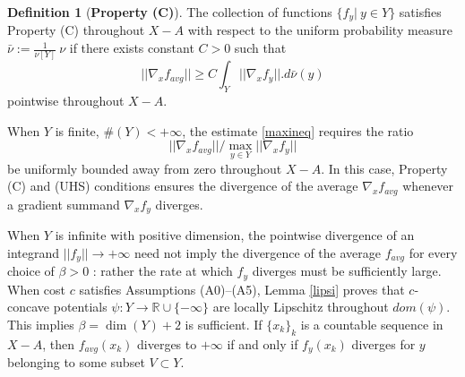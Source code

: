 \documentclass[12pt]{amsart}
\newtheorem{lem}{Lemma}
\theoremstyle{definition}
\newtheorem{dfn}{Definition}
\theoremstyle{remark}
\newcommand{\bR}{\mathbb{R}}
\begin{document}
\begin{dfn}[\textbf{Property (C)}] \label{a5spec}
The collection of functions $\{f_y|~y\in Y\}$ satisfies Property (C) throughout $X-A$ with respect to the uniform probability measure $\bar{\nu}:=\frac{1}{\nu[Y]}~\nu$ if there exists constant $C>0$ such that \begin{equation}
||\nabla_x f_{avg}|| \geq C \int_Y ||\nabla_x f_y||.d\bar{\nu}(y) \label{maxineq}
\end{equation}
pointwise throughout $X-A$.
\end{dfn}

When $Y$ is finite, $\#(Y)<+\infty$, the estimate \eqref{maxineq} requires the ratio $$||\nabla_x f_{avg}||/ \max_{y\in Y}||\nabla_x f_y||$$ be uniformly bounded away from zero throughout $X-A$. In this case, Property (C) and (UHS) conditions ensures the divergence of the average $\nabla_x f_{avg}$ whenever a gradient summand $\nabla_x f_y$ diverges. 

When $Y$ is infinite with positive dimension, the pointwise divergence of an integrand $||f_y||\to +\infty$ need not imply the divergence of the average $f_{avg}$ for every choice of $\beta>0$ : rather the rate at which $f_y$ diverges must be sufficiently large. When cost $c$ satisfies Assumptions (A0)--(A5), Lemma \ref{lipsi} proves that $c$-concave potentials $\psi: Y\to \bR \cup \{-\infty\}$ are locally Lipschitz throughout $dom(\psi)$. This implies $\beta =\dim(Y)+2$ is sufficient. If $\{x_k\}_k$ is a countable sequence in $X-A$, then $f_{avg}(x_k)$ diverges to $+\infty$ if and only if $f_y(x_k)$ diverges for $y$ belonging to some subset $V\subset Y$. 









\end{document}
